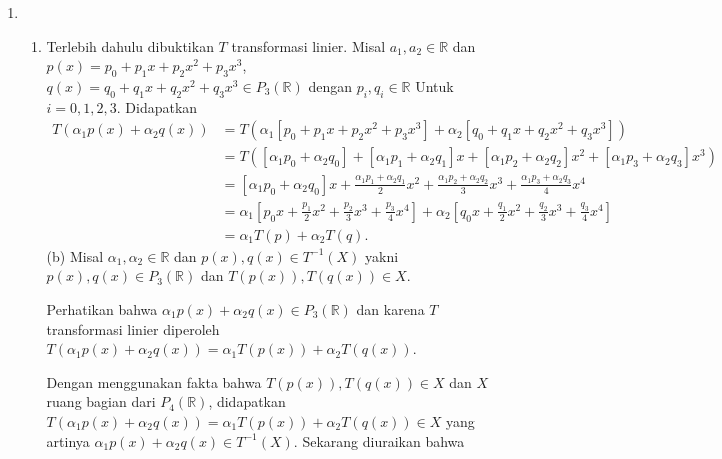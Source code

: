 \documentclass[11pt,letterpaper]{article}
\begin{document}
\begin{enumerate}
  \item \begin{enumerate}
          \item Terlebih dahulu dibuktikan $T$ transformasi linier. Misal $a_1, a_2 \in \mathbb{R}$ dan $p(x) = p_0 + p_1x + p_2x^2 + p_3x^3$, $q(x) = q_0 + q_1x + q_2x^2 + q_3x^3 \in P_3(\mathbb{R})$ dengan $p_i, q_i \in \mathbb{R}$ Untuk $i = 0, 1, 2, 3$. Didapatkan
                \[
                  \begin{aligned}
                    T(\alpha_1 p(x) + \alpha_2 q(x))
                     & = T(\alpha_1 [p_0 + p_1x + p_2x^2 + p_3x^3] + \alpha_2 [q_0 + q_1x + q_2x^2 + q_3x^3])                                                                            \\
                     & = T([\alpha_1 p_0 + \alpha_2 q_0] + [\alpha_1 p_1 + \alpha_2 q_1]x + [\alpha_1 p_2 + \alpha_2 q_2]x^2 + [\alpha_1 p_3 + \alpha_2 q_3]x^3)                         \\
                     & = [\alpha_1 p_0 + \alpha_2 q_0]x + \frac{\alpha_1 p_1 + \alpha_2 q_1}{2}x^2 + \frac{\alpha_1 p_2 + \alpha_2 q_2}{3}x^3 + \frac{\alpha_1 p_3 + \alpha_2 q_3}{4}x^4 \\
                     & = \alpha_1 \left[p_0x + \frac{p_1}{2}x^2 + \frac{p_2}{3}x^3 + \frac{p_3}{4}x^4 \right]
                    + \alpha_2 \left[q_0x + \frac{q_1}{2}x^2 + \frac{q_2}{3}x^3 + \frac{q_3}{4}x^4 \right]                                                                               \\
                     & = \alpha_1 T(p) + \alpha_2 T(q).
                  \end{aligned}
                \]
                (b) Misal $\alpha_1, \alpha_2 \in \mathbb{R}$ dan $p(x), q(x) \in T^{-1}(X)$ yakni $p(x), q(x) \in P_3(\mathbb{R})$ dan $T(p(x)), T(q(x)) \in X$.

                Perhatikan bahwa $\alpha_1 p(x) + \alpha_2 q(x) \in P_3(\mathbb{R})$ dan karena $T$ transformasi linier diperoleh $T(\alpha_1 p(x) + \alpha_2 q(x)) = \alpha_1 T(p(x)) + \alpha_2 T(q(x))$.

                Dengan menggunakan fakta bahwa $T(p(x)), T(q(x)) \in X$ dan $X$ ruang bagian dari $P_4(\mathbb{R})$, didapatkan $T(\alpha_1 p(x) + \alpha_2 q(x)) = \alpha_1 T(p(x)) + \alpha_2 T(q(x)) \in X$ yang artinya $\alpha_1 p(x) + \alpha_2 q(x) \in T^{-1}(X)$. Sekarang diuraikan bahwa


\end{enumerate}
\end{enumerate}
\end{document}
